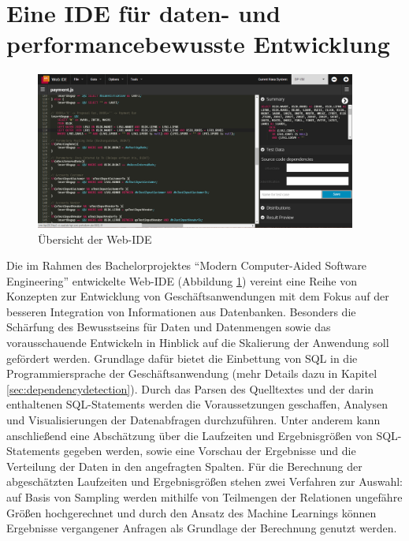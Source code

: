 \section{Eine IDE f{\"u}r daten- und performancebewusste Entwicklung}\label{chap:entwicklungsumgebung}

%
%

\begin{figure}[ht]
	\centering
  \includegraphics[width=0.94\textwidth]{figures/ide.png}
	\caption{Übersicht der Web-IDE}
	\label{fig:ide}
\end{figure}

Die im Rahmen des Bachelorprojektes ``Modern Computer-Aided Software Engineering'' entwickelte Web-IDE (Abbildung \ref{fig:ide}) vereint eine Reihe von Konzepten zur Entwicklung von Geschäftsanwendungen mit dem Fokus auf der besseren Integration von Informationen aus Datenbanken.
Besonders die Schärfung des Bewusstseins für Daten und Datenmengen sowie das vorausschauende Entwickeln in Hinblick auf die Skalierung der Anwendung soll gefördert werden.
Grundlage dafür bietet die Einbettung von SQL in die Programmiersprache der Geschäftsanwendung \cite{Horschig2014} (mehr Details dazu in Kapitel \ref{sec:dependencydetection}).
Durch das Parsen des Quelltextes \cite{Horschig2014} und der darin enthaltenen SQL-Statements \cite{Schulz2014} werden die Voraussetzungen geschaffen, Analysen und Visualisierungen der Datenabfragen durchzuführen.
Unter anderem kann anschließend eine Abschätzung über die Laufzeiten und Ergebnisgrößen von SQL-Statements gegeben werden, sowie eine Vorschau der Ergebnisse und die Verteilung der Daten in den angefragten Spalten.
Für die Berechnung der abgeschätzten Laufzeiten und Ergebnisgrößen stehen zwei Verfahren zur Auswahl: auf Basis von Sampling \cite{Exner2014} werden mithilfe von Teilmengen der Relationen ungefähre Größen hochgerechnet und durch den Ansatz des Machine Learnings \cite{Mues2014} können Ergebnisse vergangener Anfragen als Grundlage der Berechnung genutzt werden.

